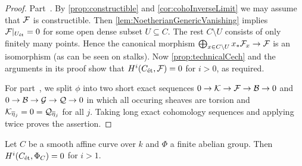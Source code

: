 \begin{proof}
	Part~. By \cref{prop:constructible} and \cref{cor:cohoInverseLimit} we may assume that $\mathcal{F}$ is constructible. Then \cref{lem:NoetherianGenericVanishing} implies $\mathcal{F}|_{U_{\mathrm{\acute{e}t}}}=0$ for some open dense subset $U\subseteq C$. The rest $C\setminus U$ consists of only finitely many points. Hence the canonical morphism $\bigoplus_{x\in C\setminus U}x_*\Ff_x\morphism \Ff$ is an isomorphism (as can be seen on stalks). Now \cref{prop:technicalCech} and the arguments in its proof show that $H^i(C_{\mathrm{\acute{e}t}},\mathcal{F})=0$ for $i>0$, as required.
	
	For part~, we split $\phi$ into two short exact sequences $0\morphism \Kk\morphism \Ff\morphism \Bb\morphism 0$ and $0\morphism \Bb\morphism \Gg\morphism \Qq\morphism 0$ in which all occuring sheaves are torsion and $\Kk_{\ov{\eta}_j}=0=\Qq_{\ov{\eta}_j}$ for all $j$. Taking long exact cohomology sequences and applying  twice proves the assertion.
\end{proof}
\begin{lem}\label{lem:affineConstantSheaf}
	Let $C$ be a smooth affine curve over $k$ and $\Phi$ a finite abelian group. Then $H^i(C_{\mathrm{\acute{e}t}},\Phi_C)=0$ for $i>1$.
\end{lem}
